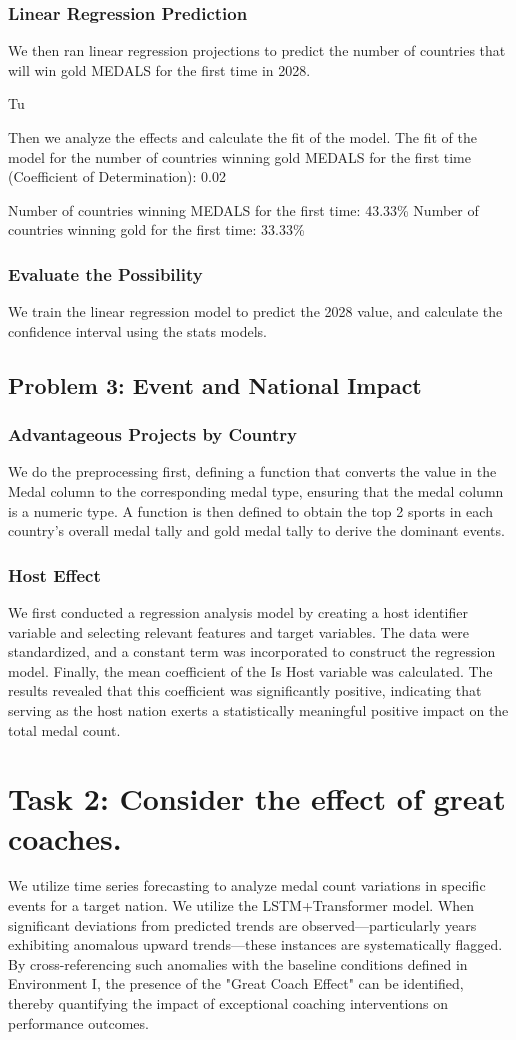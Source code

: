 \documentclass{mcmthesis}
\begin{document}
  \subsubsection{Linear Regression Prediction} 
We then ran linear regression projections to predict the number of countries that will win gold MEDALS for the first time in 2028.
  
  Tu
  
  Then we analyze the effects and calculate the fit of the model. The fit of the model for the number of countries winning gold MEDALS for the first time (Coefficient of Determination): 0.02
  
  Number of countries winning MEDALS for the first time: 43.33\% Number of countries winning gold for the first time: 33.33\%
  \subsubsection{ Evaluate the Possibility} 
 We train the linear regression model to predict the 2028 value, and calculate the confidence interval using the stats models.
 \subsection{Problem 3: Event and National Impact} 
 \subsubsection{Advantageous Projects by Country}
 We do the preprocessing first, defining a function that converts the value in the Medal column to the corresponding medal type, ensuring that the medal column is a numeric type. A function is then defined to obtain the top 2 sports in each country's overall medal tally and gold medal tally to derive the dominant events.
 \subsubsection{Host Effect}
 We first conducted a regression analysis model by creating a host identifier variable and selecting relevant features and target variables. The data were standardized, and a constant term was incorporated to construct the regression model. Finally, the mean coefficient of the Is Host variable was calculated. The results revealed that this coefficient was significantly positive, indicating that serving as the host nation exerts a statistically meaningful positive impact on the total medal count.
 \section{Task 2: Consider the effect of great coaches. } 
 We utilize time series forecasting to analyze medal count variations in specific events for a target nation. We utilize the LSTM+Transformer model. When significant deviations from predicted trends are observed—particularly years exhibiting anomalous upward trends—these instances are systematically flagged. By cross-referencing such anomalies with the baseline conditions defined in Environment I, the presence of the "Great Coach Effect" can be identified, thereby quantifying the impact of exceptional coaching interventions on performance outcomes.
\end{document}
